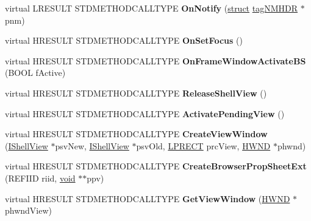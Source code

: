 \begin{DoxyCompactItemize}
virtual L\+R\+E\+S\+U\+LT S\+T\+D\+M\+E\+T\+H\+O\+D\+C\+A\+L\+L\+T\+Y\+PE {\bfseries On\+Notify} (\hyperlink{interfacestruct}{struct} \hyperlink{structtag_n_m_h_d_r}{tag\+N\+M\+H\+DR} $\ast$pnm)
\item 
\mbox{\label{class_c_shell_browser_ab5d54205da05037fe878b9b560456d0d}} 
virtual H\+R\+E\+S\+U\+LT S\+T\+D\+M\+E\+T\+H\+O\+D\+C\+A\+L\+L\+T\+Y\+PE {\bfseries On\+Set\+Focus} ()
\item 
\mbox{\label{class_c_shell_browser_a37dc5b0286942220d05bc1cd40e37b23}} 
virtual H\+R\+E\+S\+U\+LT S\+T\+D\+M\+E\+T\+H\+O\+D\+C\+A\+L\+L\+T\+Y\+PE {\bfseries On\+Frame\+Window\+Activate\+BS} (B\+O\+OL f\+Active)
\item 
\mbox{\label{class_c_shell_browser_a7c555e2a7485b35b1ea3fc76a76660b4}} 
virtual H\+R\+E\+S\+U\+LT S\+T\+D\+M\+E\+T\+H\+O\+D\+C\+A\+L\+L\+T\+Y\+PE {\bfseries Release\+Shell\+View} ()
\item 
\mbox{\label{class_c_shell_browser_add30a901c1e2a9bde5c0fdf2f56f639d}} 
virtual H\+R\+E\+S\+U\+LT S\+T\+D\+M\+E\+T\+H\+O\+D\+C\+A\+L\+L\+T\+Y\+PE {\bfseries Activate\+Pending\+View} ()
\item 
\mbox{\label{class_c_shell_browser_a7d530f17991d9b23669a22ad333e2164}} 
virtual H\+R\+E\+S\+U\+LT S\+T\+D\+M\+E\+T\+H\+O\+D\+C\+A\+L\+L\+T\+Y\+PE {\bfseries Create\+View\+Window} (\hyperlink{interface_i_shell_view}{I\+Shell\+View} $\ast$psv\+New, \hyperlink{interface_i_shell_view}{I\+Shell\+View} $\ast$psv\+Old, \hyperlink{structtag_r_e_c_t}{L\+P\+R\+E\+CT} prc\+View, \hyperlink{interfacevoid}{H\+W\+ND} $\ast$phwnd)
\item 
\mbox{\label{class_c_shell_browser_a3c0e23e033fc4c093fb0c7de26a09611}} 
virtual H\+R\+E\+S\+U\+LT S\+T\+D\+M\+E\+T\+H\+O\+D\+C\+A\+L\+L\+T\+Y\+PE {\bfseries Create\+Browser\+Prop\+Sheet\+Ext} (R\+E\+F\+I\+ID riid, \hyperlink{interfacevoid}{void} $\ast$$\ast$ppv)
\item 
\mbox{\label{class_c_shell_browser_a509c0389f9d59e7982a6cbcf84e86070}} 
virtual H\+R\+E\+S\+U\+LT S\+T\+D\+M\+E\+T\+H\+O\+D\+C\+A\+L\+L\+T\+Y\+PE {\bfseries Get\+View\+Window} (\hyperlink{interfacevoid}{H\+W\+ND} $\ast$phwnd\+View)
$$
\end{DoxyCompactItemize}
